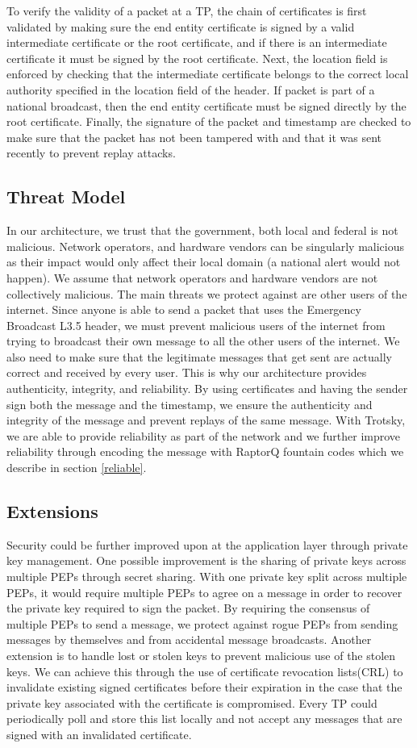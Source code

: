 To verify the validity of a packet at a TP, the chain of certificates is first validated by making sure the end entity certificate is signed by a valid intermediate certificate or the root certificate, and if there is an intermediate certificate it must be signed by the root certificate. Next, the location field is enforced by checking that the intermediate certificate belongs to the correct local authority specified in the location field of the header. If packet is part of a national broadcast, then the end entity certificate must be signed directly by the root certificate. Finally, the signature of the packet and timestamp are checked to make sure that the packet has not been tampered with and that it was sent recently to prevent replay attacks.
\subsection{Threat Model}
In our architecture, we trust that the government, both local and federal is not malicious.  Network operators, and hardware vendors can be singularly malicious as their impact would only affect their local domain (a national alert would not happen). We assume that network operators and hardware vendors are not collectively malicious. The main threats we protect against are other users of the internet. Since anyone is able to send a packet that uses the Emergency Broadcast L3.5 header, we must prevent malicious users of the internet from trying to broadcast their own message to all the other users of the internet. We also need to make sure that the legitimate messages that get sent are actually correct and received by every user. This is why our architecture provides authenticity, integrity, and reliability.
By using certificates and having the sender sign both the message and the timestamp, we ensure the authenticity and integrity of the message and prevent replays of the same message. With Trotsky, we are able to provide reliability as part of the network and we further improve reliability through encoding the message with RaptorQ fountain codes which we describe in section \ref{reliable}.
\subsection{Extensions}
Security could be further improved upon at the application layer through private key management. One possible improvement is the sharing of private keys across multiple PEPs through secret sharing. With one private key split across multiple PEPs, it would require multiple PEPs to agree on a message in order to recover the private key required to sign the packet. By requiring the consensus of multiple PEPs to send a message, we protect against rogue PEPs from sending messages by themselves and from accidental message broadcasts. Another extension is to handle lost or stolen keys to prevent malicious use of the stolen keys. We can achieve this through the use of certificate revocation lists(CRL) to invalidate existing signed certificates before their expiration in the case that the private key associated with the certificate is compromised. Every TP could periodically poll and store this list locally and not accept any messages that are signed with an invalidated certificate.


